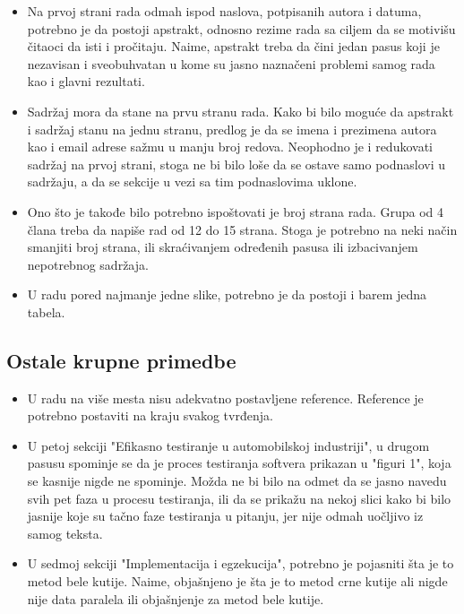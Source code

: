 \documentclass[a4paper]{report}
\begin{document}
\begin{itemize}

  \item Na prvoj strani rada odmah ispod naslova, potpisanih autora i datuma, potrebno je da postoji apstrakt, odnosno rezime rada sa ciljem da se motivišu čitaoci da isti i pročitaju. Naime, apstrakt treba da čini jedan pasus koji je nezavisan i sveobuhvatan u kome su jasno naznačeni problemi samog rada kao i glavni rezultati. 
  \item Sadržaj mora da stane na prvu stranu rada. Kako bi bilo moguće da apstrakt i sadržaj stanu na jednu stranu, predlog je da se imena i prezimena autora kao i email adrese sažmu u manju broj redova. Neophodno je i redukovati sadržaj na prvoj strani, stoga ne bi bilo loše da se ostave samo podnaslovi u sadržaju, a da se sekcije u vezi sa tim podnaslovima uklone.
  \item Ono što je takođe bilo potrebno ispoštovati je broj strana rada. Grupa od 4 člana treba da napiše rad od 12 do 15 strana. Stoga je potrebno na neki način smanjiti broj strana, ili skraćivanjem određenih pasusa ili izbacivanjem nepotrebnog sadržaja.
  \item U radu pored najmanje jedne slike, potrebno je da postoji i barem jedna tabela.

\end{itemize}

\subsection{Ostale krupne primedbe}

\begin{itemize}

\item U radu na više mesta nisu adekvatno postavljene reference. Reference je potrebno postaviti na kraju svakog tvrđenja.
 
\item U petoj sekciji "Efikasno testiranje u automobilskoj industriji", u drugom pasusu spominje se da je proces testiranja softvera prikazan u "figuri 1", koja se kasnije nigde ne spominje. Možda ne bi bilo na odmet da se jasno navedu svih pet faza u procesu testiranja, ili da se prikažu na nekoj slici kako bi bilo jasnije koje su tačno faze testiranja u pitanju, jer nije odmah uočljivo iz samog teksta.

\item U sedmoj sekciji "Implementacija i egzekucija", 
potrebno je pojasniti šta je to metod bele kutije. Naime, objašnjeno je šta je to metod crne kutije ali nigde nije data paralela ili objašnjenje za metod bele kutije.

\end{itemize}
\end{document}
